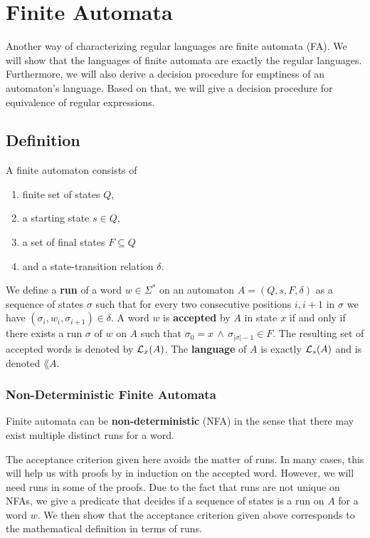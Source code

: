 
\chapter{Finite Automata}
\label{chap:FA}

Another way of characterizing regular languages are finite automata (FA)\cite{DBLP:books/daglib/0011126}. 
We will show that the languages of finite automata are exactly the regular languages.
Furthermore, we will also derive a decision procedure for emptiness of an automaton's language.
Based on that, we will give a decision procedure for equivalence of regular expressions.

\section{Definition}
A finite automaton consists of
\begin{enumerate}
    \item
        finite set of states $Q$, 
    \item 
        a starting state $s \in Q$, 
    \item 
        a set of final states $F \subseteq Q$ 
    \item 
        and a state-transition relation $\delta$. 
\end{enumerate}

We define a \textbf{run} of a word $w \in \Sigma^*$ on an automaton $A = (Q, s, F, \delta)$ as a sequence of states $\sigma$ such that 
for every two consecutive positions $i,i+1$ in $\sigma$ we have 
$(\sigma_i, w_i, \sigma_{i+1}) \in \delta$.
A word $w$ is \textbf{accepted} by $A$ in state $x$ if and only if there exists a run $\sigma$ of $w$ on $A$ such that $\sigma_0 = x \, \wedge \, \sigma_{\vert\sigma\vert-1} \in F$.
The resulting set of accepted words is denoted by $\mathcal{L}_{x}(A)$.
The \textbf{language} of $A$ is exactly $\mathcal{L}_{s}(A)$ and is denoted $\lang{A}$. 

\subsection{Non-Deterministic Finite Automata}
Finite automata can be \textbf{non-deterministic} (NFA) in the sense that there may exist multiple distinct runs for a word. 



The acceptance criterion given here avoids the matter of runs.
In many cases, this will help us with proofs by in induction on the accepted word.
However, we will need runs in some of the proofs.
Due to the fact that runs are not unique on NFAs, 
we give a predicate that decides if a sequence of states is a run on $A$ for a word $w$.
We then show that the acceptance criterion given above corresponds to the mathematical definition in terms of runs.

